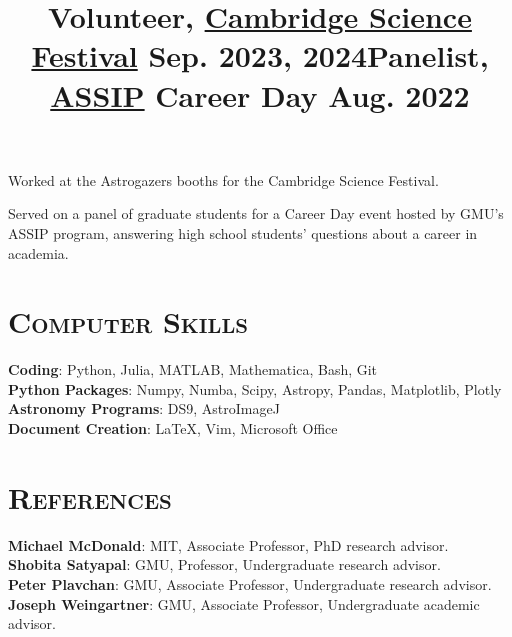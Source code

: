 \documentclass[marg, centered]{res}
\begin{document}
\begin{resume}
\vspace{-0.2cm}
\title{\textbf{Volunteer}, \href{https://cambridgesciencefestival.org/}{\color{dkbu} Cambridge Science Festival} \hfill \textbf{Sep. 2023, 2024}}
\begin{position}
{\small Worked at the Astrogazers booths for the Cambridge Science Festival.}
\end{position}

\vspace{-0.2cm}
\title{\textbf{Panelist}, \href{https://science.gmu.edu/assip}{\color{dkbu} ASSIP} Career Day \hfill \textbf{Aug. 2022}}
\begin{position}
{\small Served on a panel of graduate students for a Career Day event hosted by GMU's ASSIP program, answering high school students' questions about a career in academia.}
\end{position}


\section{\scshape \bfseries Computer Skills}

\textbf{Coding}{: Python, Julia, MATLAB, Mathematica, Bash, Git} \\ 
\textbf{Python Packages}{: Numpy, Numba, Scipy, Astropy, Pandas, Matplotlib, Plotly} \\
\textbf{Astronomy Programs}{: DS9, AstroImageJ} \\
\textbf{Document Creation}{: \LaTeX, Vim, Microsoft Office} \\


\section{{\scshape \bfseries References}}
\textbf{Michael McDonald}{: MIT, Associate Professor, PhD research advisor.}\\
\textbf{Shobita Satyapal}{: GMU, Professor, Undergraduate research advisor.}\\
\textbf{Peter Plavchan}{: GMU, Associate Professor, Undergraduate research advisor.}\\
\textbf{Joseph Weingartner}{: GMU,  Associate Professor, Undergraduate academic advisor.}\\

\end{resume}
\end{document}

